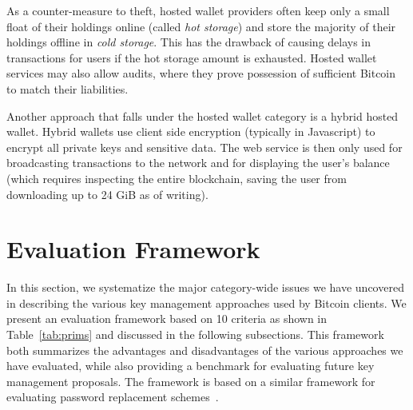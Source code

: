 As a counter-measure to theft, hosted wallet providers often keep only a small float of their holdings online (called \textit{hot storage}) and store the majority of their holdings offline in \textit{cold storage}. This has the drawback of causing delays in transactions for users if the hot storage amount is exhausted.
Hosted wallet services may also allow audits, where they prove possession of sufficient Bitcoin to match their liabilities.  

Another approach that falls under the hosted wallet category is a hybrid hosted wallet. Hybrid wallets use client side encryption (typically in Javascript) to encrypt all private keys and sensitive data. The web service is then only used for broadcasting transactions to the network and for displaying the user's balance (which requires inspecting the entire blockchain, saving the user from downloading up to 24 GiB as of writing). 




\section{Evaluation Framework}
In this section, we systematize the major category-wide issues we have uncovered in describing the various key management approaches used by Bitcoin clients. We present an evaluation framework based on 10 criteria as shown in Table~\ref{tab:prims} and discussed in the following subsections. This framework both summarizes the advantages and disadvantages of the various approaches we have evaluated, while also providing a benchmark for evaluating future key management proposals. The framework is based on a similar framework for evaluating password replacement schemes~\cite{BHOS12}.

